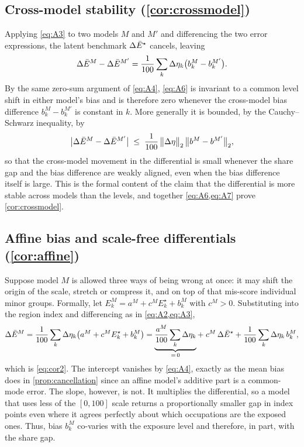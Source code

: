 \subsection{Cross-model stability (\texorpdfstring{\cref{cor:crossmodel}}{Corollary 1})}

Applying \cref{eq:A3} to two models $M$ and $M'$ and differencing the two error expressions, the latent benchmark $\Delta\bar{E}^{\star}$ cancels, leaving
\begin{equation}\label{eq:A6}
\Delta\bar{E}^{M} - \Delta\bar{E}^{M'}
= \frac{1}{100} \sum_k \Delta\eta_k
\bigl(b^{M}_k - b^{M'}_k\bigr) .
\end{equation}
By the same zero-sum argument of \cref{eq:A4}, \cref{eq:A6} is invariant to a common level shift in either model's bias and is therefore zero whenever the cross-model bias difference $b^{M}_k - b^{M'}_k$ is constant in $k$. More generally it is bounded, by the Cauchy--Schwarz inequality, by
\begin{equation}\label{eq:A7}
\bigl| \Delta\bar{E}^{M} - \Delta\bar{E}^{M'} \bigr|
\;\le\;
\frac{1}{100}\,
\bigl\lVert \Delta\eta \bigr\rVert_2\,
\bigl\lVert b^{M} - b^{M'} \bigr\rVert_2 ,
\end{equation}
so that the cross-model movement in the differential is small whenever the share gap and the bias difference are weakly aligned, even when the bias difference itself is large. This is the formal content of the claim that the differential is more stable across models than the levels, and together \cref{eq:A6,eq:A7} prove \cref{cor:crossmodel}.

\subsection{Affine bias and scale-free differentials (\texorpdfstring{\cref{cor:affine}}{Corollary 2})}

Suppose model $M$ is allowed three ways of being wrong at once: it may shift the origin of the scale, stretch or compress it, and on top of that mis-score individual minor groups. Formally, let $E^{M}_k = a^{M} + c^{M} E^{\star}_k + b^{M}_k$ with $c^{M} > 0$. Substituting into the region index and differencing as in \cref{eq:A2,eq:A3},
\begin{equation}\label{eq:A6b}
\Delta\bar{E}^{M}
= \frac{1}{100} \sum_k \Delta\eta_k \bigl( a^{M} + c^{M} E^{\star}_k + b^{M}_k \bigr)
= \underbrace{\frac{a^{M}}{100} \sum_k \Delta\eta_k}_{=\,0}
+\; c^{M}\, \Delta\bar{E}^{\star}
+ \frac{1}{100} \sum_k \Delta\eta_k\, b^{M}_k ,
\end{equation}
which is \cref{eq:cor2}. The intercept vanishes by \cref{eq:A4}, exactly as the mean bias does in \cref{prop:cancellation} since an affine model's additive part is a common-mode error. The slope, however, is not. It multiplies the differential, so a model that uses less of the $[0,100]$ scale returns a proportionally smaller gap in index points even where it agrees perfectly about which occupations are the exposed ones. Thus, bias $b^{M}_k$ co-varies with the exposure level and therefore, in part, with the share gap.

